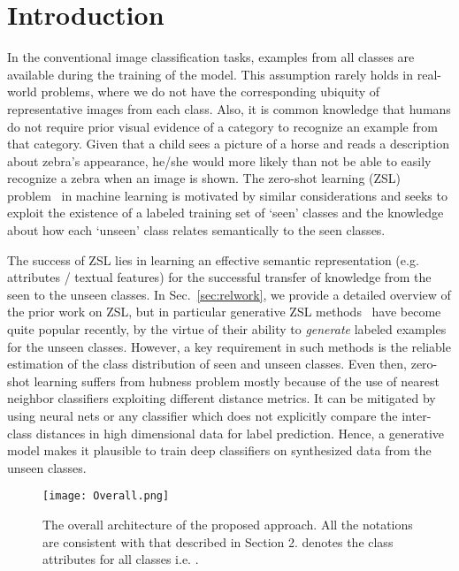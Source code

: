 \documentclass[10pt,twocolumn,letterpaper]{article}
\begin{document}
\section{Introduction}
In the conventional image classification tasks, examples from all classes are available during the training of the model. This assumption rarely holds in real-world problems, where we do not have the corresponding ubiquity of representative images from each class. Also, it is common knowledge that humans do not require prior visual evidence of a category to recognize an example from that category. Given that a child sees a picture of a horse and reads a description about zebra's appearance, he/she would more likely than not be able to easily recognize a zebra when an image is shown. The zero-shot learning (ZSL) problem~\cite{cmt,xian2018zero} in machine learning is motivated by similar considerations and seeks to exploit the existence of a labeled training set of `seen' classes and the knowledge about how each `unseen' class relates semantically to the seen classes.  

The success of ZSL lies in learning an effective semantic representation (e.g. attributes / textual features) for the successful transfer of knowledge from the seen to the unseen classes. In Sec.~\ref{sec:relwork}, we provide a detailed overview of the prior work on ZSL, but in particular generative ZSL methods~\cite{xian2018feature,wang2017zero,verma2017simple,vermageneralized} have become quite popular recently, by the virtue of their ability to \emph{generate} labeled examples for the unseen classes. However, a key requirement in such methods is the reliable estimation of the class distribution of seen and unseen classes. Even then, zero-shot learning suffers from hubness problem \cite{dem} mostly because of the use of nearest neighbor classifiers exploiting different distance metrics. It can be mitigated by using neural nets or any classifier which does not explicitly compare the inter-class distances in high dimensional data for label prediction. Hence, a generative model makes it plausible to train deep classifiers on synthesized data from the unseen classes. 

\begin{figure*}[!htbp]
    \centering
    \texttt{[image: Overall.png]}
    \caption{The overall architecture of the proposed approach. All the notations are consistent with that described in Section 2.  denotes the class attributes for all classes i.e. . }
    \label{fig:architecture}
\end{figure*}
\end{document}
